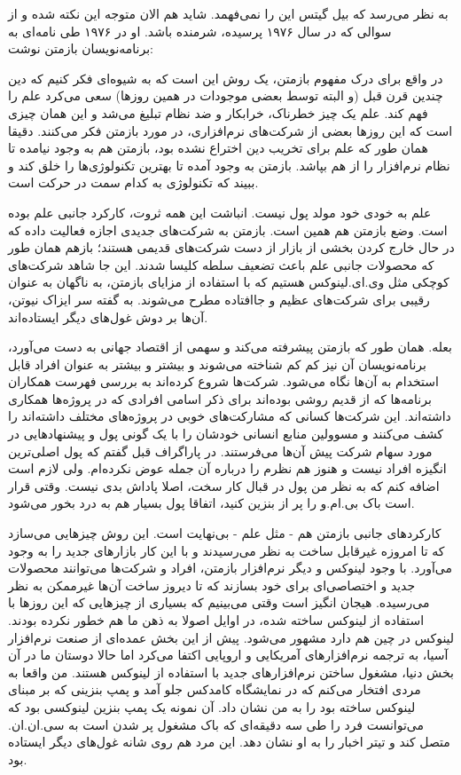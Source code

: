 به نظر می‌رسد که بیل گیتس این را نمی‌فهمد. شاید هم الان متوجه این نکته
شده و از سوالی که در سال ۱۹۷۶ پرسیده، شرمنده باشد. او در ۱۹۷۶ طی
نامه‌ای به برنامه‌نویسان بازمتن نوشت: 

در واقع برای درک مفهوم بازمتن، یک روش این است که به شیوه‌ای فکر کنیم که
دین چندین قرن قبل (و البته توسط بعضی موجودات در همین روزها) سعی می‌کرد
علم را فهم کند. علم یک چیز خطرناک، خرابکار و ضد نظام تبلیغ می‌شد و این
همان چیزی است که این روزها بعضی از شرکت‌های نرم‌افزاری، در مورد بازمتن
فکر می‌کنند. دقیقا همان طور که علم برای تخریب دین اختراع نشده بود،
بازمتن هم به وجود نیامده تا نظام نرم‌افزار را از هم بپاشد. بازمتن به
وجود آمده تا بهترین تکنولوژی‌ها را خلق کند و ببیند که تکنولوژی به کدام
سمت در حرکت است.

علم به خودی خود مولد پول نیست. انباشت این همه ثروت، کارکرد جانبی علم
بوده است. وضع بازمتن هم همین است. بازمتن به شرکت‌های جدیدی اجازه فعالیت
داده که در حال خارج کردن بخشی از بازار از دست شرکت‌های قدیمی هستند؛
بازهم همان طور که محصولات جانبی علم باعث تضعیف سلطه کلیسا شدند. این جا
شاهد شرکت‌های کوچکی مثل وی.ای.لینوکس هستیم که با استفاده از مزایای
بازمتن، به ناگهان به عنوان رقیبی برای شرکت‌های عظیم و جاافتاده مطرح
می‌شوند. به گفته سر ایزاک نیوتن، آن‌ها بر دوش غول‌های دیگر ایستاده‌اند.

بعله. همان طور که بازمتن پیشرفته می‌کند و سهمی از اقتصاد جهانی به دست
می‌آورد،‌ برنامه‌نویسان آن نیز کم کم شناخته می‌شوند و بیشتر و بیشتر به
عنوان افراد قابل استخدام به آن‌ها نگاه می‌شود. شرکت‌ها شروع کرده‌اند به
بررسی فهرست همکاران برنامه‌ها که از قدیم روشی بوده‌اند برای ذکر اسامی
افرادی که در پروژه‌ها همکاری داشته‌اند. این شرکت‌ها کسانی که مشارکت‌های
خوبی در پروژه‌های مختلف داشته‌اند را کشف می‌کنند و مسوولین منابع انسانی
خودشان را با یک گونی پول و پیشنهادهایی در مورد سهام شرکت پیش آن‌ها
می‌فرستند. در پاراگراف قبل گفتم که پول اصلی‌ترین انگیزه افراد نیست و
هنوز هم نظرم را درباره آن جمله عوض نکرده‌ام. ولی لازم است اضافه کنم که
به نظر من پول در قبال کار سخت، اصلا پاداش بدی نیست. وقتی قرار است باک
بی.ام.و را پر از بنزین کنید، اتفاقا پول بسیار هم به درد بخور می‌شود.

کارکردهای جانبی بازمتن هم - مثل علم - بی‌نهایت است. این روش چیزهایی
می‌سازد که تا امروزه غیرقابل ساخت به نظر می‌رسیدند و با این کار بازارهای
جدید را به وجود می‌آورد. با وجود لینوکس و دیگر نرم‌افزار بازمتن، افراد و
شرکت‌ها می‌توانند محصولات جدید و اختصاصی‌ای برای خود بسازند که تا دیروز
ساخت آن‌ها غیرممکن به نظر می‌رسیده. هیجان انگیز است وقتی می‌بینیم که
بسیاری از چیزهایی که این روزها با استفاده از لینوکس ساخته شده، در
اوایل اصولا به ذهن ما هم خطور نکرده بودند. لینوکس در چین هم دارد مشهور
می‌شود. پیش از این بخش عمده‌ای از صنعت نرم‌افزار آسیا، به ترجمه
نرم‌افزارهای آمریکایی و اروپایی اکتفا می‌کرد اما حالا دوستان ما در آن
بخش دنیا، مشغول ساختن نرم‌افزارهای جدید با استفاده از لینوکس هستند. من
واقعا به مردی افتخار می‌کنم که در نمایشگاه کامدکس جلو آمد و پمپ بنزینی
که بر مبنای لینوکس ساخته بود را به من نشان داد. آن نمونه یک پمپ بنزین
لینوکسی بود که می‌توانست فرد را طی سه دقیقه‌ای که باک مشغول پر شدن است
به سی.ان.ان. متصل کند و تیتر اخبار را به او نشان دهد. این مرد هم روی
شانه غول‌های دیگر ایستاده بود.

